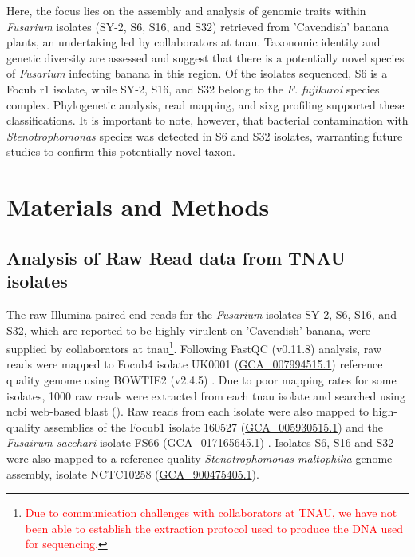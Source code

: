 Here, the focus lies on the assembly and analysis of genomic traits within \textit{Fusarium} isolates (SY-2, S6, S16, and S32) retrieved from 'Cavendish' banana plants, an undertaking led by collaborators at \ac{tnau}. Taxonomic identity and genetic diversity are assessed and suggest that there is a potentially novel species of \textit{Fusarium} infecting banana in this region. Of the isolates sequenced, S6 is a \ac{Focub} \ac{r1} isolate, while SY-2, S16, and S32 belong to the \textit{F. fujikuroi} species complex. Phylogenetic analysis, read mapping, and \ac{sixg} profiling supported these classifications. It is important to note, however, that bacterial contamination with \textit{Stenotrophomonas} species was detected in S6 and S32 isolates, warranting future studies to confirm this potentially novel taxon.

\newpage

\section{Materials and Methods}

 \subsection{Analysis of Raw Read data from TNAU isolates}

The raw Illumina paired-end reads for the \textit{Fusarium} isolates SY-2, S6, S16, and S32, which are reported to be highly virulent on 'Cavendish' banana, were supplied by collaborators at \ac{tnau}\footnote{\textcolor{red}{Due to communication challenges with collaborators at TNAU, we have not been able to establish the extraction protocol used to produce the DNA used for sequencing.}}. Following FastQC (v0.11.8)
\parencite{Andrews2010} analysis, raw reads were mapped to \ac{Focub4}  isolate UK0001 (\href{https://www.ncbi.nlm.nih.gov/datasets/genome/GCA_007994515.1/}{GCA\_007994515.1}) \parencite{Warmington2019} reference quality genome using BOWTIE2 (v2.4.5) \parencite{Langmead2012}. Due to poor mapping rates for some isolates, 1000 raw reads were extracted from each \ac{tnau} isolate and searched using \ac{ncbi} web-based \acl{blast} (\textcite{Nih2014}). Raw reads from each isolate were also mapped to high-quality assemblies of the \ac{Focub1} isolate 160527 (\href{https://www.ncbi.nlm.nih.gov/datasets/genome/GCA_005930515.1/}{GCA\_005930515.1}) \parencite{Asai2019} and the \textit{Fusairum sacchari} isolate FS66 (\href{https://www.ncbi.nlm.nih.gov/datasets/genome/GCA_017165645.1/}{GCA\_017165645.1}) \parencite{Cui2021}. Isolates S6, S16 and S32 were also mapped to a reference quality \textit{Stenotrophomonas maltophilia} genome assembly, isolate NCTC10258 (\href{https://www.ncbi.nlm.nih.gov/datasets/genome/GCF_900475405.1/}{GCA\_900475405.1}). 


